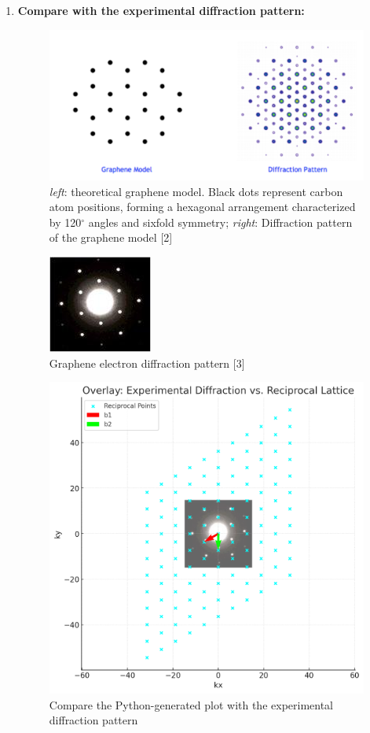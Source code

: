 \documentclass[12pt,a4paper]{article}
\begin{document}
\begin{CJK}{UTF8}{bkai}
\begin{enumerate}
\begin{enumerate}
        \clearpage 
        \item \textbf{Compare with the experimental diffraction pattern:}
        \begin{figure}[h]
            \centering
            \includegraphics[width=0.4\linewidth]{figures/result_2_2_10.png}
            \caption{\textit{left}: theoretical graphene model. Black dots represent carbon atom positions, forming a hexagonal arrangement characterized by 120$^\circ$ angles and sixfold symmetry; \textit{right}: Diffraction pattern of the graphene model [2]}
            \label{fig:result_2_2_10}
        \end{figure}
        \begin{figure}[h]
            \centering
            \includegraphics[width=0.15\linewidth]{figures/result_2_2_11.png}
            \caption{Graphene electron diffraction pattern [3]}
            \label{fig:result_2_2_11}
        \end{figure}
        \begin{figure}[h]
            \centering
            \includegraphics[width=0.5\linewidth]{figures/result_2_2_12.png}
            \vspace{-0.5cm}
            \caption{Compare the Python-generated plot with the experimental diffraction pattern}
            \label{fig:result_2_2_12}
        \end{figure}

\end{enumerate}
\end{enumerate}
\end{CJK}
\end{document}
